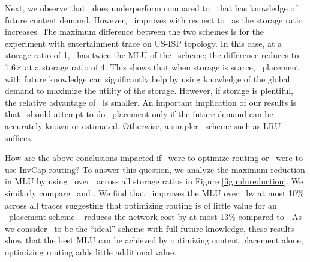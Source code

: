 Next, we observe that \invlru\ does underperform compared to \optrpfuture\ that has knowledge of future content demand. However, \invlru\ improves with respect to \optrpfuture\ as the storage ratio increases.  The maximum difference between the two schemes is for the experiment with entertainment trace on US-ISP topology. In this case, at a storage ratio of 1,  \invlru\ has twice the MLU of the \optrpfuture\ scheme; the difference reduces to 1.6$\times$ at a storage ratio of 4. This shows that when storage is scarce, \planned\  placement with future knowledge can significantly help by using knowledge of the global demand to maximize the utility of the storage. However, if storage is plentiful, the relative advantage of \optrpfuture\ is smaller. An important implication of our results is that \ancp\ should attempt to do \planned\  placement only if the future demand can be accurately known or estimated. Otherwise, a simpler \unplanned\  scheme such as LRU suffices.   






How are the above conclusions impacted if  \invlru\  were to optimize routing or   \optrpfuture\  were to use InvCap routing? To answer this question, we analyze the maximum reduction in MLU by using \optlru\ over \invlru\ across all storage ratios in Figure  \ref{fig:mlureduction}. We similarly compare \optrpfuture\ and \invoptpfuture.   We find that \optlru\ improves the MLU over  \invlru\ by at most 10\% across all traces suggesting that optimizing routing is of little value for an \unplanned\  placement scheme.   \optrpfuture\  reduces the network cost by at most 13\% compared to \invoptpfuture. As we consider \optrpfuture\ to be the ``ideal'' scheme with full future knowledge, these results show that the best MLU can be achieved by optimizing content placement alone; optimizing routing adds little additional value.

